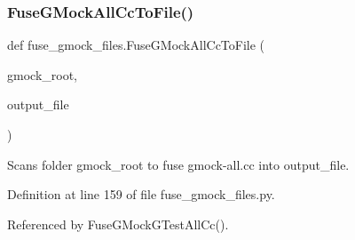 \subsubsection{\texorpdfstring{Fuse\+G\+Mock\+All\+Cc\+To\+File()}{FuseGMockAllCcToFile()}}
{\footnotesize\ttfamily def fuse\+\_\+gmock\+\_\+files.\+Fuse\+G\+Mock\+All\+Cc\+To\+File (\begin{DoxyParamCaption}\item[{}]{gmock\+\_\+root,  }\item[{}]{output\+\_\+file }\end{DoxyParamCaption})}

\begin{DoxyVerb}Scans folder gmock_root to fuse gmock-all.cc into output_file.\end{DoxyVerb}
 

Definition at line 159 of file fuse\+\_\+gmock\+\_\+files.\+py.



Referenced by Fuse\+G\+Mock\+G\+Test\+All\+Cc().


